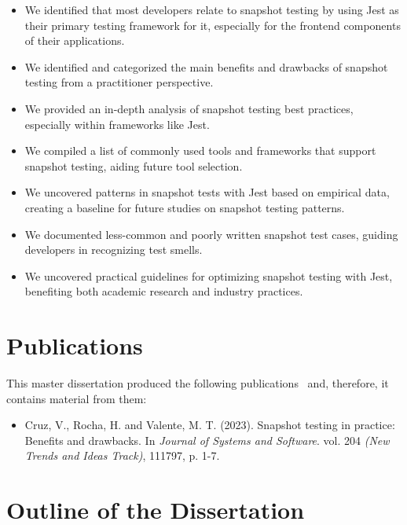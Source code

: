 \documentclass[
	msc, %
	english %
]{../ppgccufmg}
\begin{document}
        \begin{itemize}
          \item We identified that most developers relate to snapshot testing by using Jest as their primary testing framework for it, especially for the frontend components of their applications.
          \item We identified and categorized the main benefits and drawbacks of snapshot testing from a practitioner perspective.
          \item We provided an in-depth analysis of snapshot testing best practices, especially within frameworks like Jest.
          \item We compiled a list of commonly used tools and frameworks that support snapshot testing, aiding future tool selection.
          \item We uncovered patterns in snapshot tests with Jest based on empirical data, creating a baseline for future studies on snapshot testing patterns.
          \item We documented less-common and poorly written snapshot test cases, guiding developers in recognizing test smells.
          \item We uncovered practical guidelines for optimizing snapshot testing with Jest, benefiting both academic research and industry practices.
        \end{itemize}

        \section{Publications}\label{sec:ch1-publications}

        This master dissertation produced the following publications~\cite{Gazzinelli2023JSS} and, therefore, it contains material from them:

        \begin{itemize}
          \item Cruz, V., Rocha, H. and Valente, M. T. (2023). Snapshot testing in practice: Benefits and drawbacks. In \textit{Journal of Systems and Software}. vol. 204 \textit{(New Trends and Ideas Track)}, 111797, p. 1-7.
        \end{itemize}

        \section{Outline of the Dissertation}\label{sec:ch1-dissertation-outline}
\end{document}
